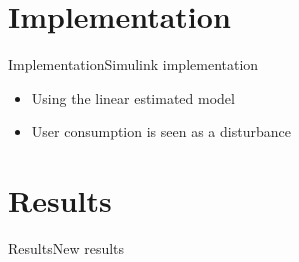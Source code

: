 \section{Implementation}

\begin{frame}{Implementation}{Simulink implementation}

\begin{itemize}
	\item<1-> Using the linear estimated model 
	\item<1-> User consumption is seen as a disturbance  
\end{itemize}

\begin{figure}[H]
\centering
 
\end{figure}

\end{frame}




\section{Results}

\begin{frame}{Results}{New results}
\end{frame}

